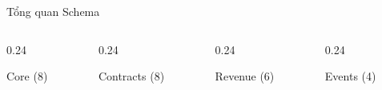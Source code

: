 \begin{frame}{Tổng quan Schema}
    \begin{columns}[T]
        \begin{column}{0.24\textwidth}
            \begin{alertblock}{\centering\small Core (8)}
                \scriptsize
                 \\
                 \\
                 \\
                 \\
                 \\
                 \\
                 \\
            \end{alertblock}
        \end{column}
        \begin{column}{0.24\textwidth}
            \begin{block}{\centering\small Contracts (8)}
                \scriptsize
                 \\
                 \\
                 \\
                 \\
                 \\
                 \\
                 \\
            \end{block}
        \end{column}
        \begin{column}{0.24\textwidth}
            \begin{block}{\centering\small Revenue (6)}
                \scriptsize
                 \\
                 \\
                 \\
                 \\
                 \\
            \end{block}
        \end{column}
        \begin{column}{0.24\textwidth}
            \begin{exampleblock}{\centering\small Events (4)}
                \scriptsize
                 \\
                 \\
                 \\
            \end{exampleblock}
        \end{column}
    \end{columns}


\end{frame}
